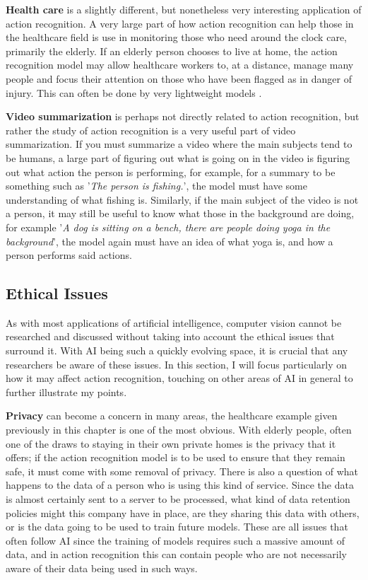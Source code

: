 \textbf{Health care} is a slightly different, but nonetheless very interesting application of action recognition. A very large part of how action recognition can help those in the healthcare field is use in monitoring those who need around the clock care, primarily the elderly. If an elderly person chooses to live at home, the action recognition model may allow healthcare workers to, at a distance, manage many people and focus their attention on those who have been flagged as in danger of injury. This can often be done by very lightweight models \cite{Eldermonitoring}.

\textbf{Video summarization} is perhaps not directly related to action recognition, but rather the study of action recognition is a very useful part of video summarization. If you must summarize a video where the main subjects tend to be humans, a large part of figuring out what is going on in the video is figuring out what action the person is performing, for example, for a summary to be something such as '\textit{The person is fishing.}', the model must have some understanding of what fishing is. Similarly, if the main subject of the video is not a person, it may still be useful to know what those in the background are doing, for example '\textit{A dog is sitting on a bench, there are people doing yoga in the background}', the model again must have an idea of what yoga is, and how a person performs said actions.

\subsection{Ethical Issues}

As with most applications of artificial intelligence, computer vision cannot be researched and discussed without taking into account the ethical issues that surround it. With AI being such a quickly evolving space, it is crucial that any researchers be aware of these issues. In this section, I will focus particularly on how it may affect action recognition, touching on other areas of AI in general to further illustrate my points.

\textbf{Privacy} can become a concern in many areas, the healthcare example given previously in this chapter is one of the most obvious. With elderly people, often one of the draws to staying in their own private homes is the privacy that it offers; if the action recognition model is to be used to ensure that they remain safe, it must come with some removal of privacy. There is also a question of what happens to the data of a person who is using this kind of service. Since the data is almost certainly sent to a server to be processed, what kind of data retention policies might this company have in place, are they sharing this data with others, or is the data going to be used to train future models. These are all issues that often follow AI since the training of models requires such a massive amount of data, and in action recognition this can contain people who are not necessarily aware of their data being used in such ways.

